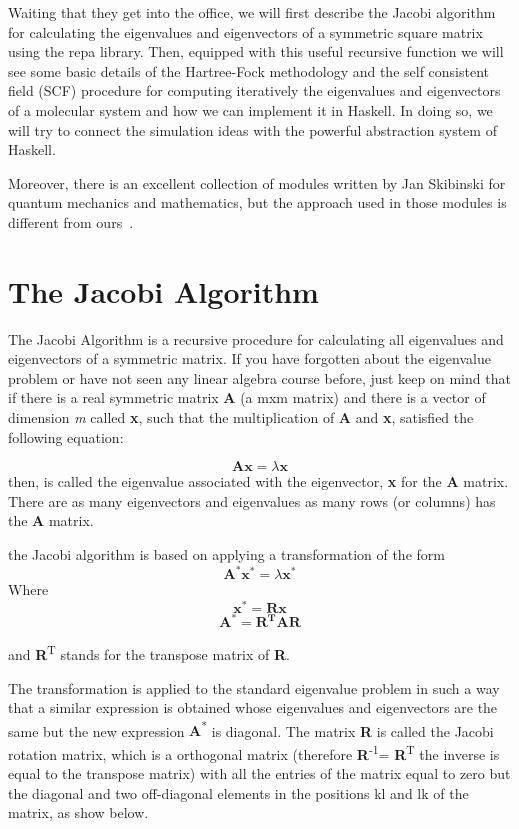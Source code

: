 \documentclass{tmr}
\begin{document}
Waiting that they get into the office, we will first describe 
the Jacobi algorithm for calculating the eigenvalues
and eigenvectors of a symmetric square matrix using the repa 
library. Then, equipped with this useful recursive function 
we will see some basic details of the Hartree-Fock methodology and
the self consistent field (SCF) procedure for computing iteratively the eigenvalues
and eigenvectors of a molecular system and how we can implement
it in Haskell. In doing so, we will try to connect the simulation ideas with 
the powerful abstraction system of Haskell.
\par Moreover, there is an excellent collection of modules written by 
Jan Skibinski for quantum mechanics and mathematics, but the approach used
in those modules is different from ours~\cite{Skibinski}.


\section{The Jacobi Algorithm}
The Jacobi Algorithm is a recursive procedure for calculating all eigenvalues
and eigenvectors of a symmetric matrix. If you have forgotten about the eigenvalue problem or 
have not seen any linear algebra course before, just keep on mind that if there is a real symmetric
matrix \textbf{A} (a mxm matrix) and there is a vector of dimension \textit{m} called \textbf{x}, such that
the multiplication of \textbf{A} and \textbf{x}, satisfied the following equation:

\[\mathbf{Ax} = \lambda \mathbf{x} \]
then, \textlambda is called the eigenvalue associated with the eigenvector, \textbf{x} for the \textbf{A} matrix.
There are as many eigenvectors and eigenvalues as many rows (or columns) has the \textbf{A} matrix.

the Jacobi algorithm is based on applying a transformation of the form 
 \[\mathbf{A^*x^*} = \lambda \mathbf{x^*}  \]
Where
\[\mathbf{x^*} = \mathbf{Rx} \]
\[\mathbf{A^*} = \mathbf{R^TAR} \]

and {\textbf R\textsuperscript{T}} stands for the transpose matrix of \textbf{R}.

The transformation is applied to the standard eigenvalue problem
in such a way that a similar expression is obtained whose 
eigenvalues and eigenvectors are the same but the
new expression {\textbf A\textsuperscript{*}} is diagonal. The matrix {\bf R} 
is called the Jacobi rotation matrix,
which is a orthogonal matrix (therefore {\textbf R\textsuperscript{-1}}= {\textbf R\textsuperscript{T}} the
inverse is equal to the transpose matrix) with all the entries of the matrix equal
 to zero but the diagonal and two off-diagonal elements
in the positions kl and lk of the matrix, as show below.
\end{document}
